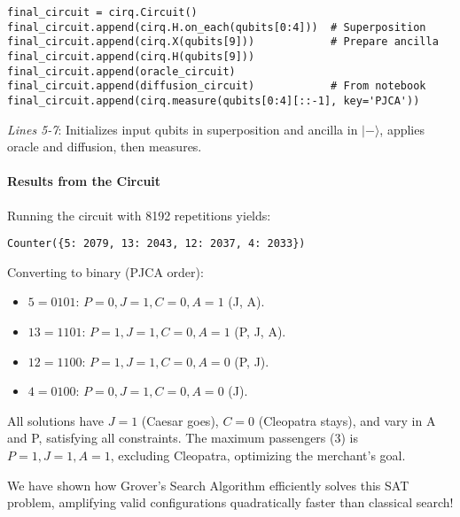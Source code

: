 \begin{verbatim}
final_circuit = cirq.Circuit()
final_circuit.append(cirq.H.on_each(qubits[0:4]))  # Superposition
final_circuit.append(cirq.X(qubits[9]))            # Prepare ancilla
final_circuit.append(cirq.H(qubits[9]))
final_circuit.append(oracle_circuit)
final_circuit.append(diffusion_circuit)            # From notebook
final_circuit.append(cirq.measure(qubits[0:4][::-1], key='PJCA'))
\end{verbatim}

\textit{Lines 5-7}: Initializes input qubits in superposition and ancilla in
$|-\rangle$, applies oracle and diffusion, then measures.

\paragraph{Results from the Circuit}\label{par:Results from the Circuit}
Running the circuit with 8192 repetitions yields:

\begin{verbatim}
Counter({5: 2079, 13: 2043, 12: 2037, 4: 2033})
\end{verbatim}

\noindent
Converting to binary (PJCA order):

\begin{itemize}
  \item $5 = 0101$: $P=0, J=1, C=0, A=1$ (J, A).
  \item $13 = 1101$: $P=1, J=1, C=0, A=1$ (P, J, A).
  \item $12 = 1100$: $P=1, J=1, C=0, A=0$ (P, J).
  \item $4 = 0100$: $P=0, J=1, C=0, A=0$ (J).
\end{itemize}

All solutions have $J=1$ (Caesar goes), $C=0$ (Cleopatra stays), and vary in
A and P, satisfying all constraints. The maximum passengers (3) is $P=1, J=1,
A=1$, excluding Cleopatra, optimizing the merchant’s goal.

We have shown how Grover’s Search Algorithm efficiently solves this SAT
problem, amplifying valid configurations quadratically faster than classical
search!

